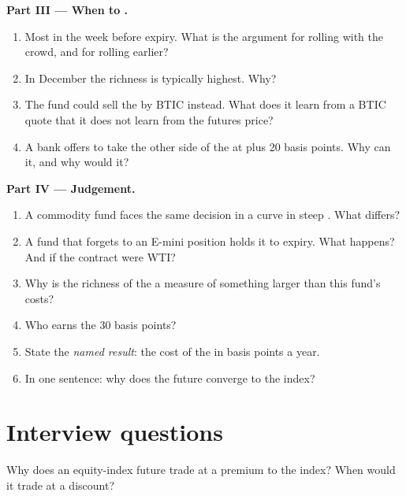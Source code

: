 \begin{problem}
\medskip\noindent\textbf{Part III --- When to .}
\begin{enumerate}[resume]
\item Most   in the week before expiry. What is the
argument for rolling with the crowd, and for rolling earlier?
\item In December the richness is typically highest. Why?
\item The fund could sell the  by BTIC instead. What does it learn from
a BTIC quote that it does not learn from the futures price?
\item A bank offers to take the other side of the  at  plus 20
basis points. Why can it, and why would it?
\end{enumerate}

\medskip\noindent\textbf{Part IV --- Judgement.}
\begin{enumerate}[resume]
\item A commodity fund faces the same decision in a curve in steep
. What differs?
\item A fund that forgets to  an E-mini position holds it to expiry.
What happens? And if the contract were WTI?
\item Why is the richness of the  a measure of something larger than
this fund's costs?
\item Who earns the 30 basis points?
\item State the \emph{named result}: the cost of the  in basis points a
year.
\item In one sentence: why does the future converge to the index?
\end{enumerate}
\end{problem}

\section{Interview questions}

\begin{interviewq}\label{iq:m1:basis-roll-and-delivery:1}
Why does an equity-index future trade at a premium to the index? When would
it trade at a discount?
\end{interviewq}


